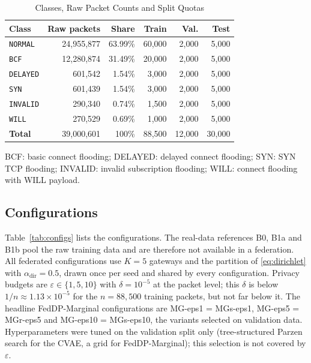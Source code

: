 \documentclass[conference]{IEEEtran}
\begin{document}
\begin{table}[!t]
\centering
\caption{Classes, Raw Packet Counts and Split Quotas}
\label{tab:data}
\scriptsize
\setlength{\tabcolsep}{4pt}
\begin{tabular}{l r r r r r}
\toprule
\textbf{Class} & \textbf{Raw packets} & \textbf{Share} & \textbf{Train} & \textbf{Val.} & \textbf{Test} \\
\midrule
\texttt{NORMAL}  & 24,955,877 & 63.99\% & 60,000 & 2,000 & 5,000 \\
\texttt{BCF}     & 12,280,874 & 31.49\% & 20,000 & 2,000 & 5,000 \\
\texttt{DELAYED} &    601,542 &  1.54\% &  3,000 & 2,000 & 5,000 \\
\texttt{SYN}     &    601,439 &  1.54\% &  3,000 & 2,000 & 5,000 \\
\texttt{INVALID} &    290,340 &  0.74\% &  1,500 & 2,000 & 5,000 \\
\texttt{WILL}    &    270,529 &  0.69\% &  1,000 & 2,000 & 5,000 \\
\midrule
\textbf{Total}   & 39,000,601 & 100\%   & 88,500 & 12,000 & 30,000 \\
\bottomrule
\end{tabular}

\vspace{2pt}
\parbox{\columnwidth}{\scriptsize BCF: basic connect flooding; DELAYED: delayed connect flooding; SYN: SYN TCP flooding; INVALID: invalid subscription flooding; WILL: connect flooding with WILL payload.}
\end{table}

\subsection{Configurations}
Table~\ref{tab:configs} lists the configurations. The real-data references B0, B1a and B1b pool the raw training data and are therefore not available in a federation. All federated configurations use $K = 5$ gateways and the partition of \eqref{eq:dirichlet} with $\alpha_{\mathrm{dir}} = 0.5$, drawn once per seed and shared by every configuration. Privacy budgets are $\varepsilon \in \{1, 5, 10\}$ with $\delta = 10^{-5}$ at the packet level; this $\delta$ is below $1/n \approx 1.13 \times 10^{-5}$ for the $n = 88{,}500$ training packets, but not far below it. The headline FedDP-Marginal configurations are MG-eps1 = MGs-eps1, MG-eps5 = MGr-eps5 and MG-eps10 = MGs-eps10, the variants selected on validation data. Hyperparameters were tuned on the validation split only (tree-structured Parzen search for the CVAE, a grid for FedDP-Marginal); this selection is not covered by $\varepsilon$.
\end{document}

